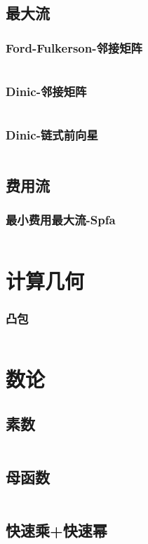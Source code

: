 \documentclass[a4paper,11pt]{article}
\begin{document}
\subsection{最大流}
\subsubsection{Ford-Fulkerson-邻接矩阵}
\inputminted[breaklines]{c++}{图论/Ford-Fulkerson-邻接矩阵.cpp}
\subsubsection{Dinic-邻接矩阵}
\inputminted[breaklines]{c++}{图论/Dinic-邻接矩阵.cpp}
\subsubsection{Dinic-链式前向星}
\inputminted[breaklines]{c++}{图论/Dinic-链式前向星.cpp}
\subsection{费用流}
\subsubsection{最小费用最大流-Spfa}
\inputminted[breaklines]{c++}{图论/最小费用最大流-SPFA.cpp}


\section{计算几何}
\subsubsection{凸包}
\inputminted[breaklines]{c++}{计算几何/凸包.cpp}
\section{数论}
\subsection{素数}
\inputminted[breaklines]{c++}{数论/素数-筛法.cpp}
\subsection{母函数}
\inputminted[breaklines]{c++}{数论/母函数.cpp}
\subsection{快速乘+快速幂}
\inputminted[breaklines]{c++}{数论/快速幂+快速乘.cpp}
\end{document}
